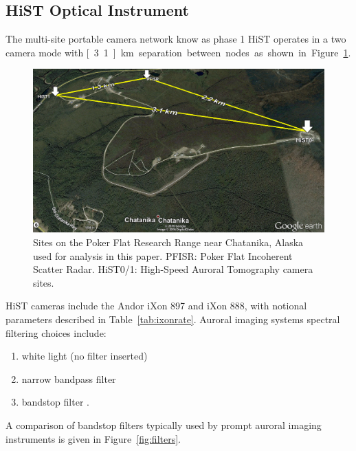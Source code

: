\FloatBarrier
\subsection{HiST Optical Instrument}\label{sec:fushist}
The multi-site portable camera network know as phase 1 HiST \citep{hirsch2016} operates in a two camera mode with \unit[3.1]{km} separation between nodes as shown in Figure~\ref{fig:sitemap}.
\begin{figure}\centering
    \includegraphics[width=0.9\columnwidth,trim=0 400 0 0,clip]{gfx/3sites}
    \caption{Sites on the Poker Flat Research Range near Chatanika, Alaska used for analysis in this paper. PFISR: Poker Flat Incoherent Scatter Radar. HiST0/1: High-Speed Auroral Tomography camera sites.}
    \label{fig:sitemap}
\end{figure}
HiST cameras include the Andor iXon 897 and iXon 888, with notional parameters described in Table~\ref{tab:ixonrate}.
Auroral imaging systems spectral filtering choices include:
\begin{enumerate}
    \item white light (no filter inserted) \citep{donovan2006}
    \item narrow bandpass filter \citep{dahlgren2015}
    \item bandstop filter \citep{semeter2008,hirsch2016}.
\end{enumerate}
A comparison of bandstop filters typically used by prompt auroral imaging instruments is given in Figure~\ref{fig:filters}.
